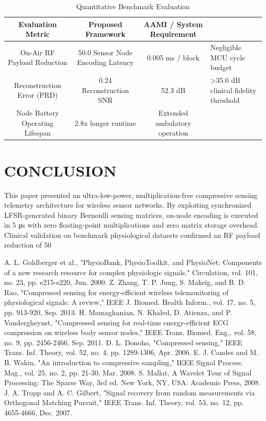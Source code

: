 \documentclass[journal,twocolumn,10pt]{IEEEtran}
\begin{document}
\begin{table}[!t]
\caption{Quantitative Benchmark Evaluation}
\centering
\begin{tabular}{ccc}
\toprule
Evaluation Metric & Proposed Framework & AAMI / System Requirement \\
\midrule
On-Air RF Payload Reduction & 50.0%
Sensor Node Encoding Latency & 0.005 ms / block & Negligible MCU cycle budget \\
Reconstruction Error (PRD) & 0.24%
Reconstruction SNR & 52.3 dB & >35.0 dB clinical fidelity threshold \\
Node Battery Operating Lifespan & 2.8x longer runtime & Extended ambulatory operation \\
\bottomrule
\end{tabular}
\end{table}

\section{CONCLUSION}
This paper presented an ultra-low-power, multiplication-free compressive sensing telemetry architecture for wireless sensor networks. By exploiting synchronized LFSR-generated binary Bernoulli sensing matrices, on-node encoding is executed in 5 μs with zero floating-point multiplications and zero matrix storage overhead. Clinical validation on benchmark physiological datasets confirmed an RF payload reduction of 50%

\begin{thebibliography}{00}

 A. L. Goldberger et al., "PhysioBank, PhysioToolkit, and PhysioNet: Components of a new research resource for complex physiologic signals," Circulation, vol. 101, no. 23, pp. e215-e220, Jun. 2000.
 Z. Zhang, T. P. Jung, S. Makeig, and B. D. Rao, "Compressed sensing for energy-efficient wireless telemonitoring of physiological signals: A review," IEEE J. Biomed. Health Inform., vol. 17, no. 5, pp. 913-920, Sep. 2013.
 H. Mamaghanian, N. Khaled, D. Atienza, and P. Vandergheynst, "Compressed sensing for real-time energy-efficient ECG compression on wireless body sensor nodes," IEEE Trans. Biomed. Eng., vol. 58, no. 9, pp. 2456-2466, Sep. 2011.
 D. L. Donoho, "Compressed sensing," IEEE Trans. Inf. Theory, vol. 52, no. 4, pp. 1289-1306, Apr. 2006.
 E. J. Candes and M. B. Wakin, "An introduction to compressive sampling," IEEE Signal Process. Mag., vol. 25, no. 2, pp. 21-30, Mar. 2008.
 S. Mallat, A Wavelet Tour of Signal Processing: The Sparse Way, 3rd ed. New York, NY, USA: Academic Press, 2008.
 J. A. Tropp and A. C. Gilbert, "Signal recovery from random measurements via Orthogonal Matching Pursuit," IEEE Trans. Inf. Theory, vol. 53, no. 12, pp. 4655-4666, Dec. 2007.
\end{thebibliography}
\end{document}
